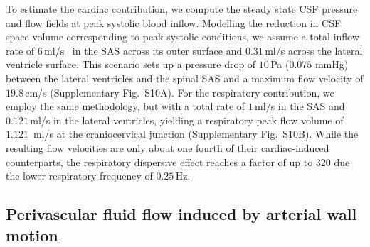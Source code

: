 \documentclass[fleqn,10pt]{wlscirep}
\begin{document}
To estimate the cardiac contribution, we compute the steady state CSF
pressure and flow fields at peak systolic blood inflow. Modelling the
reduction in CSF space volume corresponding to peak systolic
conditions, we assume a total inflow rate of
$6\,$ml/s~\cite{baledent2014imaging, causemann2022human} in the SAS
across its outer surface and $0.31\,$ml/s across the lateral ventricle
surface\cite{vinje2019respiratory}. This scenario sets up a pressure
drop of $10\,$Pa ($0.075$ mmHg) between the lateral ventricles and the
spinal SAS and a maximum flow velocity of $19.8\,$cm/s
(Supplementary Fig.~S10A). For the respiratory contribution, we
employ the same methodology, but with a total rate of $1\,$ml/s
\cite{gutierrez2022effect} in the SAS and $0.121\,$ml/s
\cite{liu2024using} in the lateral ventricles, yielding a respiratory
peak flow volume of $1.121\,$ ml/s at the craniocervical junction
(Supplementary Fig.~S10B). While the resulting flow velocities
are only about one fourth of their cardiac-induced counterparts, the
respiratory dispersive effect reaches a factor of up to 320 due the
lower respiratory frequency of $0.25\,$Hz.


\subsection*{Perivascular fluid flow induced by arterial wall motion}
\end{document}
